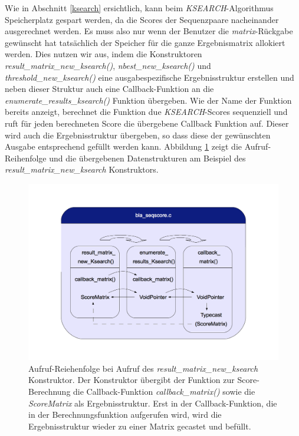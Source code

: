 \documentclass{article}
\begin{document}
Wie in Abschnitt \ref{ksearch} ersichtlich, kann beim \emph{KSEARCH}-Algorithmus Speicherplatz gespart werden, da die Scores der Sequenzpaare
nacheinander ausgerechnet werden. Es muss also nur wenn der Benutzer die \emph{matrix}-Rückgabe gewünscht hat tatsächlich der Speicher für die
ganze Ergebnismatrix allokiert werden. Dies nutzen wir aus, indem die Konstruktoren \emph{result\_matrix\_new\_ksearch()}, \emph{nbest\_new\_ksearch()} 
und  \emph{threshold\_new\_ksearch()} eine ausgabespezifische Ergebnisstruktur erstellen und neben dieser Struktur auch eine Callback-Funktion an 
die \emph{enumerate\_results\_ksearch()} Funktion übergeben. Wie der Name der Funktion bereits anzeigt, berechnet die Funktion due \emph{KSEARCH}-Scores
sequenziell und ruft für jeden berechneten Score die übergebene Callback Funktion auf. Dieser wird auch die Ergebnisstruktur übergeben, so dass diese
der gewünschten Ausgabe entsprechend gefüllt werden kann. Abbildung \ref{kscallback} zeigt die Aufruf-Reihenfolge und die übergebenen Datenstrukturen am
Beispiel des \emph{result\_matrix\_new\_ksearch} Konstruktors.

\begin{center}
  \begin{figure}
    \includegraphics[width = \linewidth]{img/dia3}
    \caption{Aufruf-Reiehenfolge bei Aufruf des \emph{result\_matrix\_new\_ksearch} Konstruktor. Der Konstruktor übergibt der Funktion zur Score-Berechnung
      die Callback-Funktion \emph{callback\_matrix()} sowie die \emph{ScoreMatrix} als Ergebnisstruktur. Erst in der Callback-Funktion, die in der 
      Berechnungsfunktion aufgerufen wird, wird die Ergebnisstruktur wieder zu einer Matrix gecastet und befüllt.}
    \label{kscallback}
  \end{figure}
\end{center}
\end{document}
